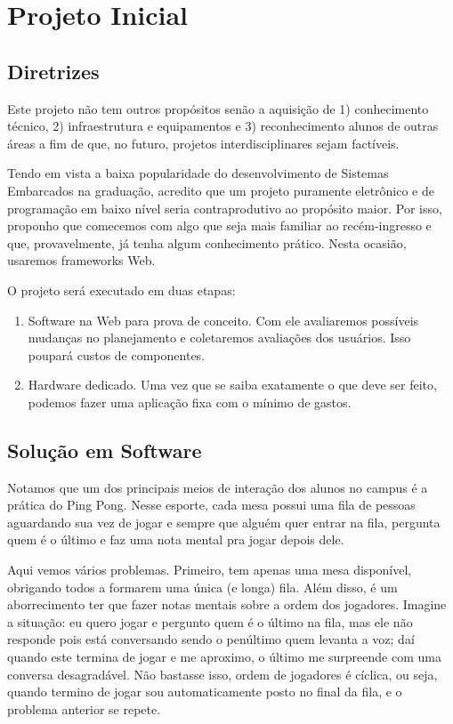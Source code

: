 \documentclass[12pt]{article}
\begin{document}
\pagebreak
\section{Projeto Inicial}
\begin{multicols}{2}

\subsection{Diretrizes}
    Este projeto não tem outros propósitos senão a aquisição de 1) conhecimento técnico, 2) infraestrutura e equipamentos e 3) reconhecimento alunos de outras áreas a fim de que, no futuro, projetos interdisciplinares sejam factíveis.

    Tendo em vista a baixa popularidade do desenvolvimento de Sistemas Embarcados na graduação, acredito que um projeto puramente eletrônico e de programação em baixo nível seria contraprodutivo ao propósito maior. Por isso, proponho que comecemos com algo que seja mais familiar ao recém-ingresso e que, provavelmente, já tenha algum conhecimento prático. Nesta ocasião, usaremos frameworks Web.

    O projeto será executado em duas etapas:
    \begin{enumerate}
        \item Software na Web para prova de conceito. Com ele avaliaremos possíveis mudanças no planejamento e coletaremos avaliações dos usuários. Isso poupará custos de componentes.
        \item Hardware dedicado. Uma vez que se saiba exatamente o que deve ser feito, podemos fazer uma aplicação fixa com o mínimo de gastos.
    \end{enumerate}

\subsection{Solução em Software}
    Notamos que um dos principais meios de interação dos alunos no campus é a prática do Ping Pong. Nesse esporte, cada mesa possui uma fila de pessoas aguardando sua vez de jogar e sempre que alguém quer entrar na fila, pergunta quem é o último e faz uma nota mental pra jogar depois dele.

    Aqui vemos vários problemas. Primeiro, tem apenas uma mesa disponível, obrigando todos a formarem uma única (e longa) fila. Além disso, é um aborrecimento ter que fazer notas mentais sobre a ordem dos jogadores. Imagine a situação: eu quero jogar e pergunto quem é o último na fila, mas ele não responde pois está conversando sendo o penúltimo quem levanta a voz; daí quando este termina de jogar e me aproximo, o último me surpreende com uma conversa desagradável. Não bastasse isso, ordem de jogadores é cíclica, ou seja, quando termino de jogar sou automaticamente posto no final da fila, e o problema anterior se repete.


\end{multicols}
\end{document}
